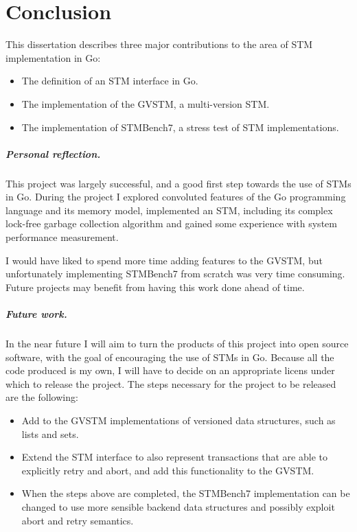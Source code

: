 \documentclass[12pt,a4paper,oneside,openright]{report}
\begin{document}

\chapter{Conclusion}

This dissertation describes three major contributions to the area of
STM implementation in Go:
\begin{itemize}
\item The definition of an STM interface in Go.
\item The implementation of the GVSTM, a multi-version STM.
\item The implementation of STMBench7, a stress test of STM
  implementations.
\end{itemize}

\paragraph{Personal reflection.} This project was largely successful,
and a good first step towards the use of STMs in Go. During the
project I explored convoluted features of the Go programming language
and its memory model, implemented an STM, including its complex
lock-free garbage collection algorithm and gained some experience with
system performance measurement.

I would have liked to spend more time adding features to the GVSTM,
but unfortunately implementing STMBench7 from scratch was very time
consuming. Future projects may benefit from having this work done
ahead of time.

\paragraph{Future work.} In the near future I will aim to turn the
products of this project into open source software, with the goal of
encouraging the use of STMs in Go. Because all the code produced is my
own, I will have to decide on an appropriate licens under which to
release the project. The steps necessary for the project to be
released are the following:
\begin{itemize}
\item Add to the GVSTM implementations of versioned data structures,
  such as lists and sets.
\item Extend the STM interface to also represent transactions that are
  able to explicitly retry and abort, and add this functionality to
  the GVSTM.
\item When the steps above are completed, the STMBench7 implementation
  can be changed to use more sensible backend data structures and
  possibly exploit abort and retry semantics.
\end{itemize}
\end{document}

